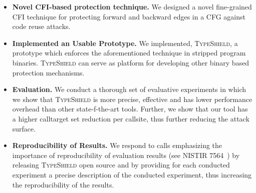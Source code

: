 %  
%  

\label{Contribution}
\begin{itemize}

 \item \textbf{Novel CFI-based protection technique.} We designed a novel fine-grained CFI technique for protecting forward and backward edges in a CFG
 against code reuse attacks.
 
 \item \textbf{Implemented an Usable Prototype.} We implemented, \textsc{TypeShield}, a prototype which enforces the aforementioned technique
 in stripped program binaries. \textsc{TypeShield} can serve as platform for developing other binary based protection mechanisms.
 
 \item \textbf{Evaluation.} We conduct a thorough set of evaluative experiments in which we show that \textsc{TypeShield} is more precise, effective and has lower performance overhead than 
 other state-f-the-art tools. Further, we show that our tool has a higher calltarget set reduction per callsite, thus further reducing the attack surface.
 
 \item \textbf{Reproducibility of Results.} 
 We respond to calls emphasizing the importance of reproducibility of evaluation results (see NISTIR 7564~\cite{reprod:nist}) by 
 releasing \textsc{TypeShield} open source and by providing for each conducted experiment a precise description of the conducted experiment, 
 thus increasing the reproducibility of the results.
 
\end{itemize}


